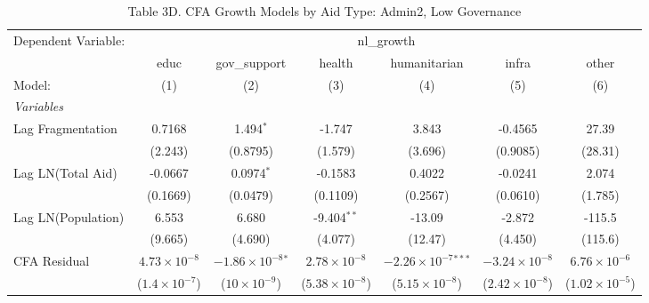\begin{table}[H]
   \caption{Table 3D. CFA Growth Models by Aid Type: Admin2, Low Governance}
   \centering
   \begin{tabular}{lcccccc}
      \tabularnewline \midrule \midrule
      Dependent Variable: & \multicolumn{6}{c}{nl\_growth}\\
                         & educ                   & gov\_support                 & health                  & humanitarian                   & infra                   & other \\   
      Model:             & (1)                    & (2)                          & (3)                     & (4)                            & (5)                     & (6)\\  
      \midrule
      \emph{Variables}\\
      Lag Fragmentation  & 0.7168                 & 1.494$^{*}$                  & -1.747                  & 3.843                          & -0.4565                 & 27.39\\   
                         & (2.243)                & (0.8795)                     & (1.579)                 & (3.696)                        & (0.9085)                & (28.31)\\   
      Lag LN(Total Aid)  & -0.0667                & 0.0974$^{*}$                 & -0.1583                 & 0.4022                         & -0.0241                 & 2.074\\   
                         & (0.1669)               & (0.0479)                     & (0.1109)                & (0.2567)                       & (0.0610)                & (1.785)\\   
      Lag LN(Population) & 6.553                  & 6.680                        & -9.404$^{**}$           & -13.09                         & -2.872                  & -115.5\\   
                         & (9.665)                & (4.690)                      & (4.077)                 & (12.47)                        & (4.450)                 & (115.6)\\   
      CFA Residual       & $4.73\times 10^{-8}$   & $-1.86\times 10^{-8}$$^{*}$  & $2.78\times 10^{-8}$    & $-2.26\times 10^{-7}$$^{***}$  & $-3.24\times 10^{-8}$   & $6.76\times 10^{-6}$\\    
                         & ($1.4\times 10^{-7}$)  & ($10\times 10^{-9}$)         & ($5.38\times 10^{-8}$)  & ($5.15\times 10^{-8}$)         & ($2.42\times 10^{-8}$)  & ($1.02\times 10^{-5}$)\\    

\end{tabular}
\end{table}
